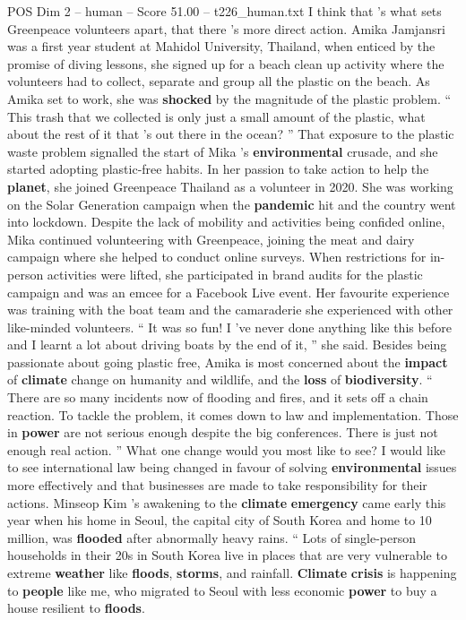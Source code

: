\begin{textsample}{POS Dim 2 – human – Score 51.00 – t226\_human.txt}
I think that ’s what sets Greenpeace volunteers apart, that there ’s more direct action.
Amika Jamjansri was a first year student at Mahidol University, Thailand, when enticed by the promise of diving lessons, she signed up for a beach clean up activity where the volunteers had to collect, separate and group all the plastic on the beach.
As Amika set to work, she was \textbf{shocked} by the magnitude of the plastic problem. “ This trash that we collected is only just a small amount of the plastic, what about the rest of it that ’s out there in the ocean? ” That exposure to the plastic waste problem signalled the start of Mika ’s \textbf{environmental} crusade, and she started adopting plastic-free habits.
In her passion to take action to help the \textbf{planet}, she joined Greenpeace Thailand as a volunteer in 2020.
She was working on the Solar Generation campaign when the \textbf{pandemic} hit and the country went into lockdown.
Despite the lack of mobility and activities being confided online, Mika continued volunteering with Greenpeace, joining the meat and dairy campaign where she helped to conduct online surveys.
When restrictions for in-person activities were lifted, she participated in brand audits for the plastic campaign and was an emcee for a Facebook Live event.
Her favourite experience was training with the boat team and the camaraderie she experienced with other like-minded volunteers. “ It was so fun!
I ’ve never done anything like this before and I learnt a lot about driving boats by the end of it, ” she said.
Besides being passionate about going plastic free, Amika is most concerned about the \textbf{impact} of \textbf{climate} change on humanity and wildlife, and the \textbf{loss} of \textbf{biodiversity}. “ There are so many incidents now of flooding and fires, and it sets off a chain reaction.
To tackle the problem, it comes down to law and implementation.
Those in \textbf{power} are not serious enough despite the big conferences.
There is just not enough real action. ” What one change would you most like to see?
I would like to see international law being changed in favour of solving \textbf{environmental} issues more effectively and that businesses are made to take responsibility for their actions.
Minseop Kim ’s awakening to the \textbf{climate} \textbf{emergency} came early this year when his home in Seoul, the capital city of South Korea and home to 10 million, was \textbf{flooded} after abnormally heavy rains. “ Lots of single-person households in their 20s in South Korea live in places that are very vulnerable to extreme \textbf{weather} like \textbf{floods}, \textbf{storms}, and rainfall. \textbf{Climate} \textbf{crisis} is happening to \textbf{people} like me, who migrated to Seoul with less economic \textbf{power} to buy a house resilient to \textbf{floods}.

\end{textsample}
